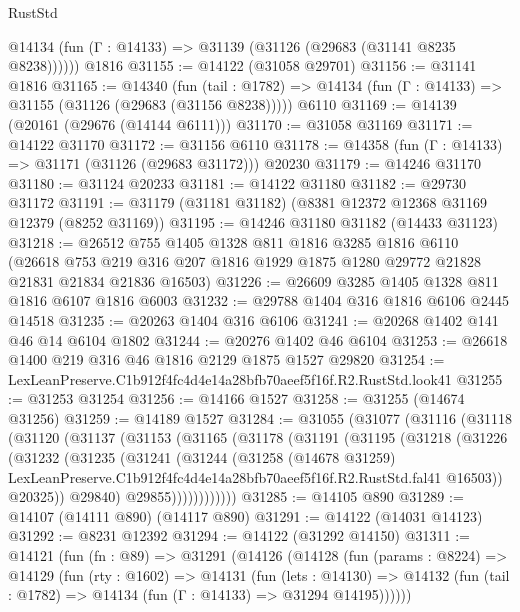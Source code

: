 \begin{lexlean}{RustStd}
\begin{coremodule}
      @14134 (fun (Γ : @14133) => @31139 (@31126 (@29683 (@31141 @8235 @8238))))))
    @1816
@31155 := @14122 (@31058 @29701)
@31156 := @31141 @1816
@31165 := @14340
    (fun (tail : @1782) => @14134 (fun (Γ : @14133) => @31155 (@31126 (@29683 (@31156 @8238)))))
    @6110
@31169 := @14139 (@20161 (@29676 (@14144 @6111)))
@31170 := @31058 @31169
@31171 := @14122 @31170
@31172 := @31156 @6110
@31178 := @14358 (fun (Γ : @14133) => @31171 (@31126 (@29683 @31172))) @20230
@31179 := @14246 @31170
@31180 := @31124 @20233
@31181 := @14122 @31180
@31182 := @29730 @31172
@31191 := @31179 (@31181 @31182) (@8381 @12372 @12368 @31169 @12379 (@8252 @31169))
@31195 := @14246 @31180 @31182 (@14433 @31123)
@31218 := @26512
    @755
    @1405
    @1328
    @811
    @1816
    @3285
    @1816
    @6110
    (@26618 @753 @219 @316 @207 @1816 @1929 @1875 @1280 @29772 @21828 @21831 @21834 @21836 @16503)
@31226 := @26609 @3285 @1405 @1328 @811 @1816 @6107 @1816 @6003
@31232 := @29788 @1404 @316 @1816 @6106 @2445 @14518
@31235 := @20263 @1404 @316 @6106
@31241 := @20268 @1402 @141 @46 @14 @6104 @1802
@31244 := @20276 @1402 @46 @6104
@31253 := @26618 @1400 @219 @316 @46 @1816 @2129 @1875 @1527 @29820
@31254 := LexLeanPreserve.C1b912f4fc4d4e14a28bfb70aeef5f16f.R2.RustStd.look41
@31255 := @31253 @31254
@31256 := @14166 @1527
@31258 := @31255 (@14674 @31256)
@31259 := @14189 @1527
@31284 := @31055
    (@31077
      (@31116
        (@31118
          (@31120
            (@31137
              (@31153
                (@31165
                  (@31178
                    (@31191
                      (@31195
                        (@31218
                          (@31226
                            (@31232
                              (@31235
                                (@31241
                                  (@31244
                                    (@31258
                                      (@14678 @31259)
                                      LexLeanPreserve.C1b912f4fc4d4e14a28bfb70aeef5f16f.R2.RustStd.fal41
                                      @16503))
                                  @20325))
                              @29840)
                            @29855))))))))))))
@31285 := @14105 @890
@31289 := @14107 (@14111 @890) (@14117 @890)
@31291 := @14122 (@14031 @14123)
@31292 := @8231 @12392
@31294 := @14122 (@31292 @14150)
@31311 := @14121
    (fun (fn : @89) =>
    @31291
      (@14126
        (@14128
          (fun (params : @8224) =>
          @14129
            (fun (rty : @1602) =>
            @14131
              (fun (lets : @14130) =>
              @14132 (fun (tail : @1782) => @14134 (fun (Γ : @14133) => @31294 @14195))))))

\end{coremodule}
\end{lexlean}
